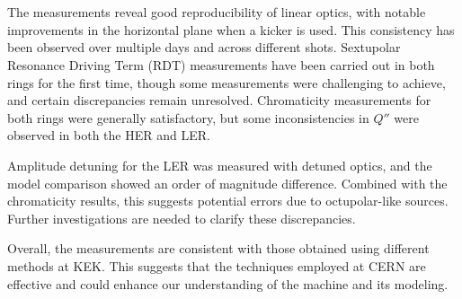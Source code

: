 \FloatBarrier
\section{}

The measurements reveal good reproducibility of linear optics, with notable improvements in the
horizontal plane when a kicker is used. This consistency has been observed over multiple days and
across different shots. Sextupolar Resonance Driving Term (RDT) measurements have been carried out
in both rings for the first time, though some measurements were challenging to achieve, and certain
discrepancies remain unresolved. Chromaticity measurements for both rings were generally
satisfactory, but some inconsistencies in $Q''$ were observed in both the HER and LER.

Amplitude detuning for the LER was measured with detuned optics, and the model comparison showed an
order of magnitude difference. Combined with the chromaticity results, this suggests potential
errors due to octupolar-like sources. Further investigations are needed to
clarify these discrepancies.

Overall, the measurements are consistent with those obtained using different methods at KEK. This
suggests that the techniques employed at CERN are effective and could enhance our understanding of
the machine and its modeling.